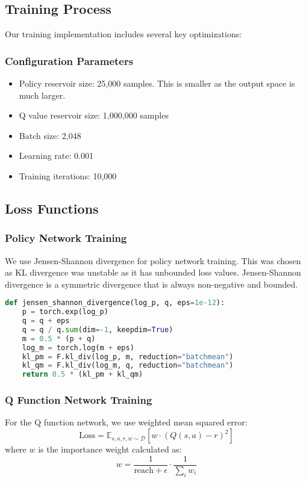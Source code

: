 \documentclass[11pt]{article}
\begin{document}
\subsection{Training Process}
Our training implementation includes several key optimizations:

\subsubsection{Configuration Parameters}
\begin{itemize}
    \item Policy reservoir size: 25,000 samples. This is smaller as the output space is much larger.
    \item Q value reservoir size: 1,000,000 samples
    \item Batch size: 2,048
    \item Learning rate: 0.001
    \item Training iterations: 10,000
\end{itemize}

\subsection{Loss Functions}
\subsubsection{Policy Network Training}
We use Jensen-Shannon divergence for policy network training. This was chosen as KL divergence was unstable as it has unbounded loss values. Jensen-Shannon divergence is a symmetric divergence that is always non-negative and bounded.
\begin{lstlisting}[language=Python]
def jensen_shannon_divergence(log_p, q, eps=1e-12):
    p = torch.exp(log_p)
    q = q + eps
    q = q / q.sum(dim=-1, keepdim=True)
    m = 0.5 * (p + q)
    log_m = torch.log(m + eps)
    kl_pm = F.kl_div(log_p, m, reduction="batchmean")
    kl_qm = F.kl_div(log_m, q, reduction="batchmean")
    return 0.5 * (kl_pm + kl_qm)
\end{lstlisting}

\subsubsection{Q Function Network Training}
For the Q function network, we use weighted mean squared error:
\[
\text{Loss} = \mathbb{E}_{s,a,r,w \sim \mathcal{D}} \left[w \cdot (Q(s,a) - r)^2\right]
\]
where $w$ is the importance weight calculated as:
\[
w = \frac{1}{\text{reach} + \epsilon} \cdot \frac{1}{\sum_{i} w_i}
\]
\end{document}
